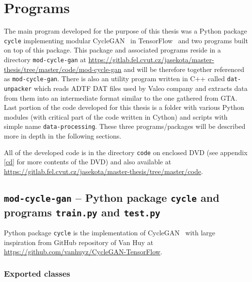 \chapter{Programs} \label{programs}

The main program developed for the purpose of this thesis was a Python package \texttt{cycle} implementing modular CycleGAN~\cite{cyclegan} in TensorFlow~\cite{tensorflow} and two programs built on top of this package. This package and associated programs reside in a directory \texttt{mod-cycle-gan} at \url{https://gitlab.fel.cvut.cz/jasekota/master-thesis/tree/master/code/mod-cycle-gan} and will be therefore together referenced as \texttt{mod-cycle-gan}. There is also an utility program written in C++ called \texttt{dat-unpacker} which reads ADTF DAT files used by Valeo company and extracts data from them into an intermediate format similar to the one gathered from GTA. Last portion of the code developed for this thesis is a folder with various Python modules (with critical part of the code written in Cython) and scripts with simple name \texttt{data-processing}. These three programs/packages will be described more in depth in the following sections.

All of the developed code is in the directory \texttt{code} on enclosed DVD (see appendix \ref{cd} for more contents of the DVD) and also available at \url{https://gitlab.fel.cvut.cz/jasekota/master-thesis/tree/master/code}.

\section[\texttt{mod-cycle-gan}]{\texttt{mod-cycle-gan} -- Python package \texttt{cycle} and programs \texttt{train.py} and \texttt{test.py}}

Python package \texttt{cycle} is the implementation of CycleGAN~\cite{cyclegan} with large inspiration from GitHub repository of Van Huy at \url{https://github.com/vanhuyz/CycleGAN-TensorFlow}.

\subsection{Exported classes}


